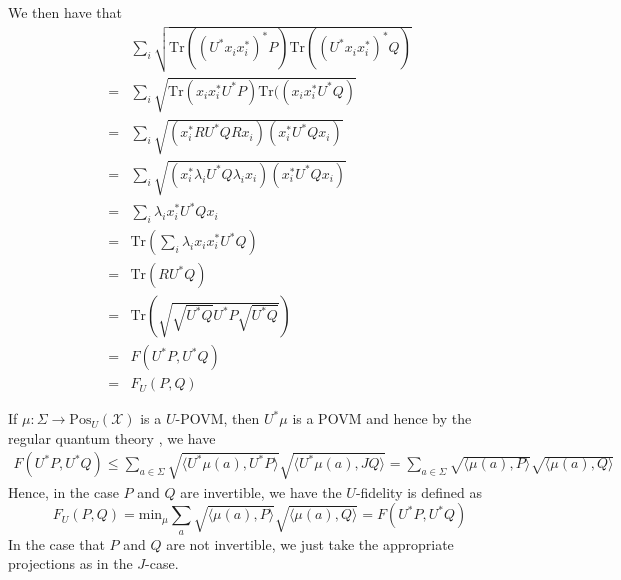 \documentclass{amsart}
\numberwithin{equation}{section}
\theoremstyle{definition}
\theoremstyle{plain}
\theoremstyle{solutionstyle}
\begin{document}
     We then have that 
    \begin{align*}
        &\sum_{i}\sqrt{\mathrm{Tr}((U^*x_ix_i^*)^*P)\mathrm{Tr}((U^*x_ix_i^*)^*Q)}\\=& \sum_{i}\sqrt{\mathrm{Tr}(x_ix_i^*U^*P)\mathrm{Tr}((x_ix_i^* U^*Q)}\\
        =& \sum_i \sqrt{(x_i^*RU^*QRx_i)(x_i^*U^*Qx_i)}\\
        =& \sum_i \sqrt{(x_i^*\lambda_i U^*Q\lambda_ix_i)(x_i^*U^*Qx_i)}\\
        =& \sum_i \lambda_ix_i^*U^*Qx_i\\
        =&\mathrm{Tr}\left(\sum_{i}\lambda_ix_ix_i^*U^*Q\right)\\=&\mathrm{Tr}(RU^*Q)\\
        =&\mathrm{Tr}\left(\sqrt{\sqrt{U^*Q}U^*P\sqrt{U^*Q}}\right)\\
        =&F(U^*P,U^*Q)\\
        =&F_U(P,Q)
    \end{align*}
    
    If $\mu:\Sigma\to \mathrm{Pos}_U(\mathcal{X})$ is a $U$-POVM, then $U^*\mu$ is a POVM and hence by the regular quantum theory \cite{Watrous_2018}, we have 
    \begin{align*}
        F(U^*P,U^*Q)\leq \sum_{a\in \Sigma}\sqrt{\langle U^*\mu(a), U^*P\rangle}\sqrt{\langle U^*\mu(a),JQ\rangle}=\sum_{a\in \Sigma}\sqrt{\langle \mu(a), P\rangle}\sqrt{\langle \mu(a),Q\rangle}
    \end{align*}
    Hence, in the case $P$ and $Q$ are invertible, we have the $U$-fidelity is defined as 
    \begin{equation*}F_U(P,Q)=\mathrm{min}_{\mu}\sum_{a}\sqrt{\langle \mu(a),P\rangle}\sqrt{\langle \mu(a), Q\rangle}=F(U^*P, U^*Q)\end{equation*}
    In the case that $P$ and $Q$ are not invertible, we just take the appropriate projections as in the $J$-case. 
\end{document}
